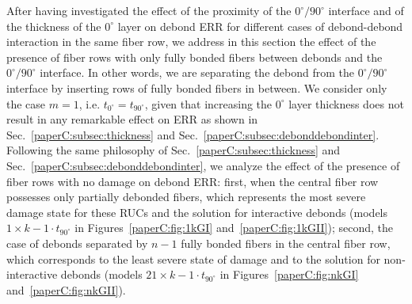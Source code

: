 After having investigated the effect of the proximity of the $0^{\circ}/90^{\circ}$ interface and of the thickness of the $0^{\circ}$ layer on debond ERR for different cases of debond-debond interaction in the same fiber row, we address in this section the effect of the presence of fiber rows with only fully bonded fibers between debonds and the $0^{\circ}/90^{\circ}$ interface. In other words, we are separating the debond from the $0^{\circ}/90^{\circ}$ interface by inserting rows of fully bonded fibers in between. We consider only the case $m=1$, i.e. $t_{0^{\circ}}=t_{90^{\circ}}$, given that increasing the $0^{\circ}$ layer thickness does not result in any remarkable effect on ERR as shown in Sec.~\ref{paperC:subsec:thickness} and Sec.~\ref{paperC:subsec:debonddebondinter}. Following the same philosophy of Sec.~\ref{paperC:subsec:thickness} and Sec.~\ref{paperC:subsec:debonddebondinter}, we analyze the effect of the presence of fiber rows with no damage on debond ERR: first, when the central fiber row possesses only partially debonded fibers, which represents the most severe damage state for these RUCs and the solution for interactive debonds (models $1\times k-1\cdot t_{90^{\circ}}$ in Figures~\ref{paperC:fig:1kGI} and~\ref{paperC:fig:1kGII}); second, the case of debonds separated by $n-1$ fully bonded fibers in the central fiber row, which corresponds to the least severe state of damage and to the solution for non-interactive debonds (models $21\times k-1\cdot t_{90^{\circ}}$ in Figures~\ref{paperC:fig:nkGI} and~\ref{paperC:fig:nkGII}).\\%


